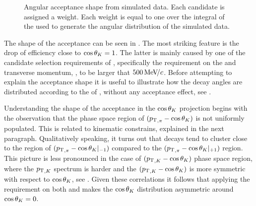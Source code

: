\begin{figure}[t]
  \centering
  \begin{subfigure}{0.49\textwidth}
    \raggedright
    \scalebox{1.12}{}
    \caption{}
    \label{angAcc_ctk}
  \end{subfigure}%
  \hfill%
  \begin{subfigure}{0.49\textwidth}
    \raggedleft
    \scalebox{1.12}{}
    \caption{}
    \label{angAcc_ctl}
  \end{subfigure}
  \vspace*{0.02\textwidth}
  \begin{subfigure}{0.49\textwidth}
    \raggedright
    \scalebox{1.12}{}
    \caption{}
    \label{angAcc_phi}
  \end{subfigure}
  \caption{Angular acceptance shape from simulated data. Each candidate is assigned a weight. Each weight is
           equal to one over the integral of the \pdf used to generate the angular distribution of the simulated data.}
  \label{angAcc_all}
\end{figure}

The shape of the acceptance can be seen in . The most striking feature is the drop of efficiency
close to $\cos\theta_{K}=1$. The latter is mainly caused by one of the candidate selection requirements of ,
specifically the requirement on the \kaon and \pion transverse momentum, \pt, to be larger that $500{\mathrm{\,Me\kern -0.1em V\!/}c}$.
Before attempting to explain the acceptance shape it is useful to illustrate how the decay angles are
distributed according to the \pdf of , \ie without any acceptance effect, see .

Understanding the shape of the acceptance in the $\cos\theta_{K}$ projection begins with the observation
that the phase space region of $(\mbox{$p_{\rm T}$}_{,\pi}-\cos\theta_{K})$ is not uniformly populated. This is related to kinematic
constrains, explained in the next paragraph. Qualitatively speaking, it turns out that \Bs decays tend to cluster
close to the region of $(\mbox{$p_{\rm T}$}_{,\pi}-\cos\theta_{K}|_{-1})$ compared to the $(\mbox{$p_{\rm T}$}_{,\pi}-\cos\theta_{K}|_{+1})$ region.
This picture is less pronounced in the case of $(\mbox{$p_{\rm T}$}_{,K}-\cos\theta_{K})$ phase space region, where the $\mbox{$p_{\rm T}$}_{,K}$
spectrum is harder and the $(\mbox{$p_{\rm T}$}_{,K}-\cos\theta_{K})$ is more symmetric with respect to $\cos\theta_{K}$, see . Given these
correlations it follows that applying the \pt requirement on both \kaon and \pion makes the $\cos\theta_{K}$ distribution
asymmetric around $\cos\theta_{K}=0$.

